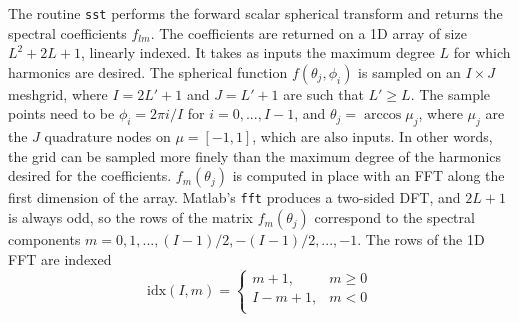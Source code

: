 The routine \texttt{sst} performs the forward scalar spherical transform and returns the spectral coefficients $f_{lm}$.  The coefficients are returned on a 1D array of size $L^2 + 2L + 1$, linearly indexed.  It takes as inputs the maximum degree $L$ for which harmonics are desired. The spherical function $f(\theta_j,\phi_i)$ is sampled on an $I \times J$ meshgrid, where $I = 2L'+1$ and $J = L'+1$ are such that $L' \ge L$.  The sample points need to be $\phi_i = 2\pi i/ I $ for $ i = 0,...,I-1$, and $\theta_j = \arccos \mu_j $, where $\mu_j$ are the $J$ quadrature nodes on $\mu = [-1, 1]$, which are also inputs. In other words, the grid can be sampled more finely than the maximum degree of the harmonics desired for the coefficients. $f_m(\theta_j)$ is computed in place with an FFT along the first dimension of the array.  Matlab's \texttt{fft} produces a two-sided DFT, and $2L+1$ is always odd, so the rows of the matrix $f_m(\theta_j)$ correspond to the spectral components $m = 0, 1, ..., (I-1)/2, -(I-1)/2, ..., -1$.  The rows of the 1D FFT are indexed 
\begin{equation}
\textrm{idx}(I,m) = \left\{ \begin{array}{cc} m + 1, & m \ge 0 \\ I - m + 1, & m < 0 \\ \end{array} \right.
\end{equation}




%

